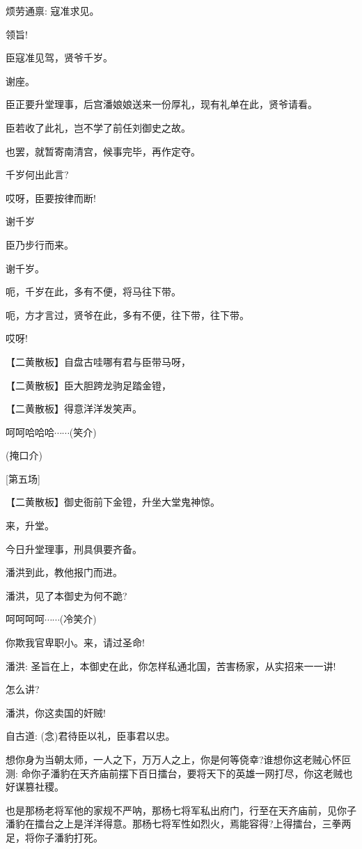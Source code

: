 {{烦劳通禀: 寇准求见。}

{领旨!}

{臣寇准见驾，贤爷千岁。}

{谢座。}

{臣正要升堂理事，后宫潘娘娘送来一份厚礼，现有礼单在此，贤爷请看。}

{臣若收了此礼，岂不学了前任刘御史之故。}

{也罢，就暂寄南清宫，候事完毕，再作定夺。}

{千岁何出此言?}

{哎呀，臣要按律而断!}

{谢千岁}

{臣乃步行而来。}

{谢千岁。}

{呃，千岁在此，多有不便，将马往下带。}

{呃，方才言过，贤爷在此，多有不便，往下带，往下带。}

{哎呀!}

\setlength{\hangindent}{60pt} {【{\akai 二黄散板}】自盘古哇哪有君与臣带马呀，}

\setlength{\hangindent}{60pt} {【{\akai 二黄散板}】臣大胆跨龙驹足踏金镫，}

\setlength{\hangindent}{60pt} {【{\akai 二黄散板}】得意洋洋发笑声。}

{呵呵哈哈哈$\cdots{}\cdots{}$(笑介)}

{(掩口介)}

{[}第五场{]}

\setlength{\hangindent}{60pt} {【{\akai 二黄散板}】御史衙前下金镫，升坐大堂鬼神惊。}

{来，升堂。}

{今日升堂理事，刑具俱要齐备。}

{潘洪到此，教他报门而进。}

{潘洪，见了本御史为何不跪?}

{呵呵呵呵$\cdots{}\cdots{}$(冷笑介)}

{你欺我官卑职小。来，请过圣命!}

{潘洪: 圣旨在上，本御史在此，你怎样私通北国，苦害杨家，从实招来一一讲!}

{怎么讲?}

{潘洪，你这卖国的奸贼!}

{自古道: ({\akai 念})君待臣以礼，臣事君以忠。}

{想你身为当朝太师，一人之下，万万人之上，你是何等侥幸?谁想你这老贼心怀叵测: 命你子潘豹在天齐庙前摆下百日擂台，要将天下的英雄一网打尽，你这老贼也好谋篡社稷。}

{也是那杨老将军他的家规不严呐，那杨七将军私出府门，行至在天齐庙前，见你子潘豹在擂台之上是洋洋得意。那杨七将军性如烈火，焉能容得?上得擂台，三拳两足，将你子潘豹打死。}

}
